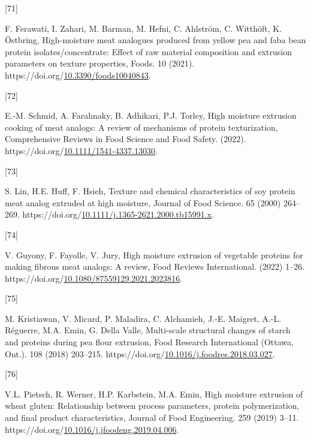 \documentclass[preprint,3p,
a4paper]{elsarticle} %
\newlength{\cslhangindent}
\newlength{\csllabelwidth}
\newlength{\cslentryspacingunit} %
\newenvironment{CSLReferences}[2] %
 {%
  \setlength{\parindent}{0pt}
  \ifodd #1
  \let\oldpar\par
  \def\par{\hangindent=\cslhangindent\oldpar}
  \fi
  \setlength{\parskip}{#2\cslentryspacingunit}
 }%
 {}
\newcommand{\CSLLeftMargin}[1]{\parbox[t]{\csllabelwidth}{#1}}
\newcommand{\CSLRightInline}[1]{\parbox[t]{\linewidth - \csllabelwidth}{#1}\break}
\begin{document}
\begin{CSLReferences}{0}{0}
\leavevmode{}%
\CSLLeftMargin{{[}71{]} }%
\CSLRightInline{F. Ferawati, I. Zahari, M. Barman, M. Hefni, C.
Ahlström, C. Witthöft, K. Östbring, High-moisture meat analogues
produced from yellow pea and faba bean protein isolates/concentrate:
Effect of raw material composition and extrusion parameters on texture
properties, Foods. 10 (2021).
https://doi.org/\href{https://doi.org/10.3390/foods10040843}{10.3390/foods10040843}.}

\leavevmode{}%
\CSLLeftMargin{{[}72{]} }%
\CSLRightInline{E.-M. Schmid, A. Farahnaky, B. Adhikari, P.J. Torley,
High moisture extrusion cooking of meat analogs: A review of mechanisms
of protein texturization, Comprehensive Reviews in Food Science and Food
Safety. (2022).
https://doi.org/\href{https://doi.org/10.1111/1541-4337.13030}{10.1111/1541-4337.13030}.}

\leavevmode{}%
\CSLLeftMargin{{[}73{]} }%
\CSLRightInline{S. Lin, H.E. Huff, F. Hsieh, Texture and chemical
characteristics of soy protein meat analog extruded at high moisture,
Journal of Food Science. 65 (2000) 264--269.
https://doi.org/\href{https://doi.org/10.1111/j.1365-2621.2000.tb15991.x}{10.1111/j.1365-2621.2000.tb15991.x}.}

\leavevmode{}%
\CSLLeftMargin{{[}74{]} }%
\CSLRightInline{V. Guyony, F. Fayolle, V. Jury, High moisture extrusion
of vegetable proteins for making fibrous meat analogs: A review, Food
Reviews International. (2022) 1--26.
https://doi.org/\href{https://doi.org/10.1080/87559129.2021.2023816}{10.1080/87559129.2021.2023816}.}

\leavevmode{}%
\CSLLeftMargin{{[}75{]} }%
\CSLRightInline{M. Kristiawan, V. Micard, P. Maladira, C. Alchamieh,
J.-E. Maigret, A.-L. Réguerre, M.A. Emin, G. Della Valle, Multi-scale
structural changes of starch and proteins during pea flour extrusion,
Food Research International (Ottawa, Ont.). 108 (2018) 203--215.
https://doi.org/\href{https://doi.org/10.1016/j.foodres.2018.03.027}{10.1016/j.foodres.2018.03.027}.}

\leavevmode{}%
\CSLLeftMargin{{[}76{]} }%
\CSLRightInline{V.L. Pietsch, R. Werner, H.P. Karbstein, M.A. Emin, High
moisture extrusion of wheat gluten: Relationship between process
parameters, protein polymerization, and final product characteristics,
Journal of Food Engineering. 259 (2019) 3--11.
https://doi.org/\href{https://doi.org/10.1016/j.jfoodeng.2019.04.006}{10.1016/j.jfoodeng.2019.04.006}.}


\end{CSLReferences}
\end{document}

